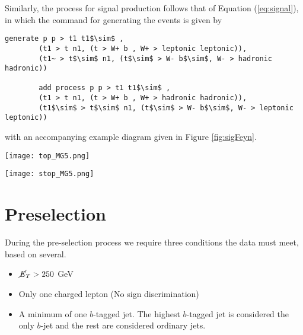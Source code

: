 Similarly, the process for signal production follows that of Equation (\ref{eq:signal}), in which the command for generating the events is given by
\begin{lstlisting}[mathescape = true]
        generate p p > t1 t1$\sim$ ,
        (t1 > t n1, (t > W+ b , W+ > leptonic leptonic)),
        (t1~ > t$\sim$ n1, (t$\sim$ > W- b$\sim$, W- > hadronic hadronic))
        
        add process p p > t1 t1$\sim$ , 
        (t1 > t n1, (t > W+ b , W+ > hadronic hadronic)), 
        (t1$\sim$ > t$\sim$ n1, (t$\sim$ > W- b$\sim$, W- > leptonic leptonic))
\end{lstlisting}
with an accompanying example diagram given in Figure \ref{fig:sigFeyn}. \\

\noindent\begin{minipage}{\textwidth}
\centering
  \begin{minipage}[htbp]{0.45\textwidth}
    \centering
    \texttt{[image: top\_MG5.png]}
    \label{fig:bkrdFeyn}
  \end{minipage}
  \begin{minipage}[htbp]{0.45\textwidth}
    \centering
    \texttt{[image: stop\_MG5.png]}
    \label{fig:sigFeyn}
  \end{minipage}
\end{minipage}
\section{Preselection}

During the pre-selection process we require three conditions the data must meet, based on several. 
\begin{itemize}
    \item $\cancel{\it{E}}_{T}>250$ GeV
    \item Only one charged lepton (No sign discrimination)
    \item A minimum of one $b$-tagged jet. The highest $b$-tagged jet is considered the only $b$-jet and the rest are considered ordinary jets.\\
\end{itemize}

